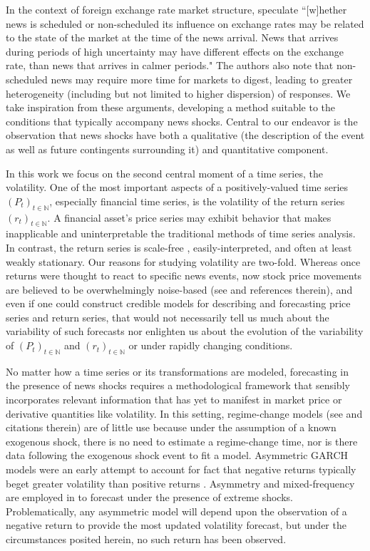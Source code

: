 \documentclass[11pt,3p,review,authoryear]{elsarticle}
\theoremstyle{definition}
\begin{document}
In the context of foreign exchange rate market structure, \citet{dominguez2006defines} speculate ``[w]hether news is scheduled or non-scheduled its influence on exchange rates may be related to the state of the market at the time of the news arrival.  News that arrives during periods of high uncertainty may have different effects on the exchange rate, than news that arrives in calmer periods." The authors also note that non-scheduled news may require more time for markets to digest, leading to greater heterogeneity (including but not limited to higher dispersion) of responses.  We take inspiration from these arguments, developing a method suitable to the conditions that typically accompany news shocks.  Central to our endeavor is the observation that news shocks have both a qualitative (the description of the event as well as future contingents surrounding it) and quantitative component.%

In this work we focus on the second central moment of a time series, the volatility.  One of the most important aspects of a positively-valued time series $(P_{t})_{t\in\mathbb{N}}$, especially financial time series, is the volatility of the return series $(r_{t})_{t\in\mathbb{N}}$.  A financial asset's price series may exhibit behavior that makes inapplicable and uninterpretable the traditional methods of time series analysis.  In contrast, the return series is scale-free \citep{tsay2005analysis}, easily-interpreted, and often at least weakly stationary.  Our reasons for studying volatility are two-fold.  Whereas once returns were thought to react to specific news events, now stock price movements are believed to be overwhelmingly noise-based (see \citet{boudoukh2019information} and references therein), and even if one could construct credible models for describing and forecasting price series and return series, that would not necessarily tell us much about the variability of such forecasts nor enlighten us about the evolution of the variability of $(P_{t})_{t\in\mathbb{N}}$ and $(r_{t})_{t\in\mathbb{N}}$ or under rapidly changing conditions. 

No matter how a time series or its transformations are modeled, forecasting in the presence of news shocks requires a methodological framework that sensibly incorporates relevant information that has yet to manifest in market price or derivative quantities like volatility.  In this setting, regime-change models (see \citet{bauwens2006regime} and citations therein) are of little use because under the assumption of a known exogenous shock, there is no need to estimate a regime-change time, nor is there data following the exogenous shock event to fit a model.  Asymmetric GARCH models were an early attempt to account for fact that negative returns typically beget greater volatility than positive returns \citep{hansen2012realized}.  Asymmetry and mixed-frequency are employed in \cite{wang2020forecasting} to forecast under the presence of extreme shocks.  Problematically, any asymmetric model will depend upon the observation of a negative return to provide the most updated volatility forecast, but under the circumstances posited herein, no such return has been observed.
\end{document}
